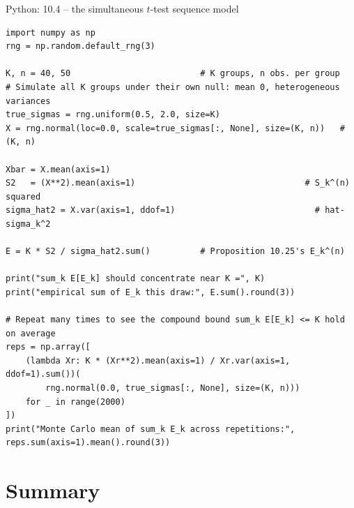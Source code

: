 \documentclass[aspectratio=169,10pt]{beamer}
\begin{document}
\begin{frame}[fragile]{Python: 10.4 -- the simultaneous $t$-test sequence model}
  \begin{lstlisting}
import numpy as np
rng = np.random.default_rng(3)

K, n = 40, 50                          # K groups, n obs. per group
# Simulate all K groups under their own null: mean 0, heterogeneous variances
true_sigmas = rng.uniform(0.5, 2.0, size=K)
X = rng.normal(loc=0.0, scale=true_sigmas[:, None], size=(K, n))   # (K, n)

Xbar = X.mean(axis=1)
S2   = (X**2).mean(axis=1)                                  # S_k^(n) squared
sigma_hat2 = X.var(axis=1, ddof=1)                            # hat-sigma_k^2

E = K * S2 / sigma_hat2.sum()          # Proposition 10.25's E_k^(n)

print("sum_k E[E_k] should concentrate near K =", K)
print("empirical sum of E_k this draw:", E.sum().round(3))

# Repeat many times to see the compound bound sum_k E[E_k] <= K hold on average
reps = np.array([
    (lambda Xr: K * (Xr**2).mean(axis=1) / Xr.var(axis=1, ddof=1).sum())(
        rng.normal(0.0, true_sigmas[:, None], size=(K, n)))
    for _ in range(2000)
])
print("Monte Carlo mean of sum_k E_k across repetitions:", reps.sum(axis=1).mean().round(3))
  \end{lstlisting}
\end{frame}

\section{Summary}
\end{document}
